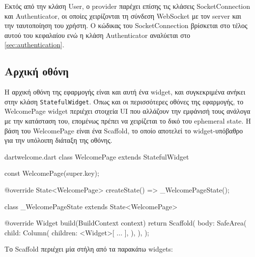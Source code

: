\documentclass[../thesis.tex]{subfiles}
\begin{document}
Εκτός από την κλάση User, ο provider παρέχει επίσης τις κλάσεις SocketConnection και Authenticator, οι οποίες χειρίζονται τη σύνδεση WebSocket με τον server και την ταυτοποίηση του χρήστη.
Ο κώδικας του SocketConnection βρίσκεται στο τέλος αυτού του κεφαλαίου ενώ η κλάση Authenticator αναλύεται στο \autoref{sec:authentication}.

\subsection{Αρχική οθόνη}

Η αρχική οθόνη της εφαρμογής είναι και αυτή ένα widget, και συγκεκριμένα ανήκει στην κλάση \texttt{StatefulWidget}.
Όπως και οι περισσότερες οθόνες της εφαρμογής, το WelcomePage widget περιέχει στοιχεία UI που αλλάζουν την εμφάνισή τους ανάλογα με την κατάσταση του, επομένως πρέπει να χειρίζεται το δικό του ephemeral state.
Η βάση του WelcomePage είναι ένα Scaffold, το οποίο αποτελεί το widget-υπόβαθρο για την υπόλοιπη διάταξη της οθόνης.

\begin{codeblock}{dart}{welcome.dart}
  class WelcomePage extends StatefulWidget {
    const WelcomePage({super.key});
  
    @override
    State<WelcomePage> createState() => _WelcomePageState();
  }

  class _WelcomePageState extends State<WelcomePage> {

    @override
    Widget build(BuildContext context) {
      return Scaffold(
        body: SafeArea(
          child: Column(
            children: <Widget>[
              ...
            ],
          ),
        ),
      );
    }
  }
\end{codeblock}

Το Scaffold περιέχει μία στήλη από τα παρακάτω widgets:
\end{document}
